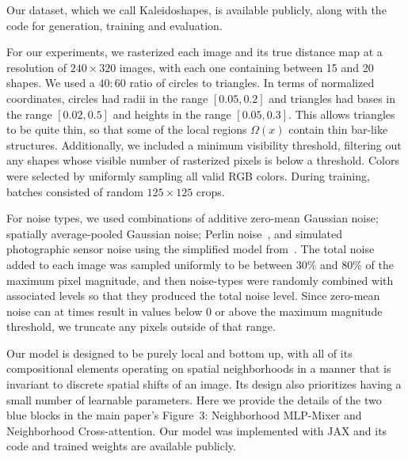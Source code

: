 \documentclass[main.tex]{subfiles}
\begin{document}
Our dataset, which we call Kaleidoshapes, is available publicly, along with the code for generation, training and evaluation.

 For our experiments, we rasterized each image and its true distance map at a resolution of $240 \times 320$ images, with each one containing between 15 and 20 shapes. We used a $40\!\!:\!\!60$ ratio of circles to triangles. In terms of normalized coordinates, circles had radii in the range $[0.05,0.2]$ and triangles had bases in the range $[0.02,0.5]$ and heights in the range $[0.05,0.3]$. This allows triangles to be quite thin, so that some of the local regions $\Omega(x)$ contain thin bar-like structures. Additionally, we included a minimum visibility threshold, filtering out any shapes whose visible number of rasterized pixels is below a threshold. Colors were selected by uniformly sampling all valid RGB colors. During training, batches consisted of random $125 \times 125$ crops.

 For noise types, we used combinations of additive zero-mean Gaussian noise; spatially average-pooled Gaussian noise; Perlin noise~\cite{perlin1985image}, and simulated photographic sensor noise using the simplified model from~\cite{wei2020physicsbased}. The total noise added to each image was sampled uniformly to be between 30\% and 80\% of the maximum pixel magnitude, and then noise-types were randomly combined with associated levels so that they produced the total noise level. Since zero-mean noise can at times result in values below 0 or above the maximum magnitude threshold, we truncate any pixels outside of that range.


Our model is designed to be purely local and bottom up, with all of its compositional elements operating on spatial neighborhoods in a manner that is invariant to discrete spatial shifts of an image. Its design also prioritizes having a small number of learnable parameters. Here we provide the details of the two blue blocks in the main paper's Figure~3: Neighborhood MLP-Mixer and Neighborhood Cross-attention. Our model was implemented with JAX and its code and trained weights are available publicly. 

\end{document}

